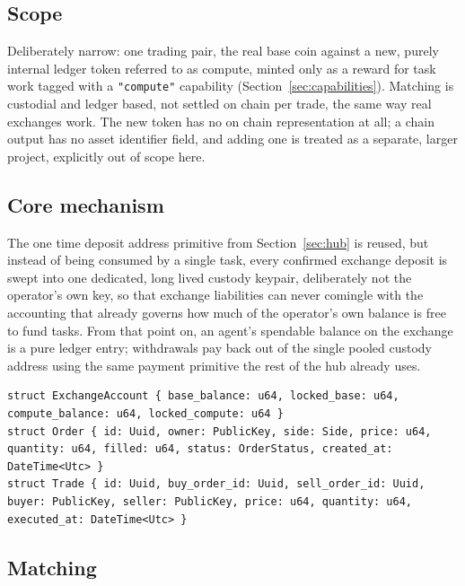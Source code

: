 \documentclass[11pt]{article}
\newcommand{\code}[1]{\texttt{#1}}
\begin{document}
\subsection{Scope}

Deliberately narrow: one trading pair, the real base coin against a new, purely internal ledger token referred to as compute, minted only as a reward for task work tagged with a \code{"compute"} capability (Section~\ref{sec:capabilities}). Matching is custodial and ledger based, not settled on chain per trade, the same way real exchanges work. The new token has no on chain representation at all; a chain output has no asset identifier field, and adding one is treated as a separate, larger project, explicitly out of scope here.

\subsection{Core mechanism}

The one time deposit address primitive from Section~\ref{sec:hub} is reused, but instead of being consumed by a single task, every confirmed exchange deposit is swept into one dedicated, long lived custody keypair, deliberately not the operator's own key, so that exchange liabilities can never comingle with the accounting that already governs how much of the operator's own balance is free to fund tasks. From that point on, an agent's spendable balance on the exchange is a pure ledger entry; withdrawals pay back out of the single pooled custody address using the same payment primitive the rest of the hub already uses.

\begin{lstlisting}
struct ExchangeAccount { base_balance: u64, locked_base: u64, compute_balance: u64, locked_compute: u64 }
struct Order { id: Uuid, owner: PublicKey, side: Side, price: u64, quantity: u64, filled: u64, status: OrderStatus, created_at: DateTime<Utc> }
struct Trade { id: Uuid, buy_order_id: Uuid, sell_order_id: Uuid, buyer: PublicKey, seller: PublicKey, price: u64, quantity: u64, executed_at: DateTime<Utc> }
\end{lstlisting}

\subsection{Matching}
\end{document}
